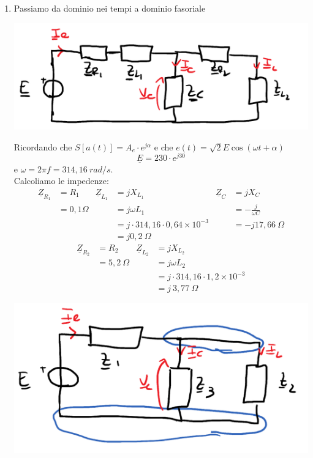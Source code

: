 \documentclass{article}
\begin{document}
\begin{enumerate}[label=\protect\circled{\arabic*}]
    \item Passiamo da dominio nei tempi a dominio fasoriale
    \begin{center}
        \includegraphics[scale=0.26]{Image/Es_Regime_Sinusoiudale_1_1.png}
    \end{center}
    Ricordando che $S[a(t)]=A_e \cdot e^{j \alpha}$ e che $e(t) = \sqrt{2} E \cos(\omega t + \alpha)$
    \[\underline{E}=230 \cdot e^{j 30}\]
    e $\omega = 2 \pi f = 314,16 \ rad/s$.
    \vspace*{0.1cm}\\
    Calcoliamo le impedenze:
    \begin{align*}
        \underline{Z}_{R_1} &= R_1 & 
        \underline{Z}_{L_1} &= j X_{L_1}&
        \underline{Z}_C &= j X_C\\
        &=0,1 \Omega & &=j \omega L_1 & &=-\frac{j}{\omega C}
        \\
        & & 
        &= j \cdot 314,16 \cdot 0,64 \times 10^{-3} &
        &= - j 17,66 \ \Omega
        \\
        & & 
        &= j 0,2 \ \Omega
    \end{align*}
    \begin{align*}
        \underline{Z}_{R_2} &= R_2 &
        \underline{Z}_{L_2} &= jX_{L_2}
        \\
        &= 5,2 \ \Omega & &= j \omega L_2
        \\
        & &
        &=j \cdot 314,16 \cdot 1,2 \times 10^{-3}
        \\
        & &
        &= j \ 3,77 \ \Omega
    \end{align*}
    \begin{center}
        \includegraphics[scale=0.26]{Image/Es_Regime_Sinusoiudale_1_2.png}

\end{center}
\end{enumerate}
\end{document}
